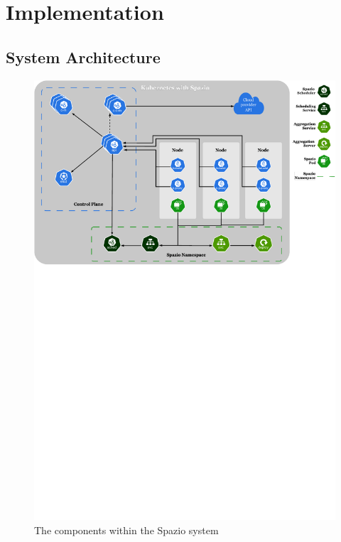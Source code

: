 \chapter{Implementation}

\section{System Architecture}
\label{sec:sys-arch}

\begin{figure}[H]
    \centering
    \includegraphics[width=\textwidth]{images/spazio-svg.pdf}
    \caption{The components within the Spazio system}
    \label{fig:spazio-system}
\end{figure}


